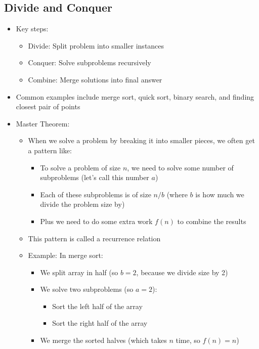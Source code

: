 \documentclass[11pt,a4paper]{article}
\begin{document}
\begin{multicols}{2}
\subsection{Divide and Conquer}
\begin{itemize}
    \item Key steps:
    \begin{itemize}
        \item Divide: Split problem into smaller instances
        \item Conquer: Solve subproblems recursively
        \item Combine: Merge solutions into final answer
    \end{itemize}
    \item Common examples include merge sort, quick sort, binary search, and finding closest pair of points
    \item Master Theorem:
    \begin{itemize}
        \item When we solve a problem by breaking it into smaller pieces, we often get a pattern like:
        \begin{itemize}
            \item To solve a problem of size $n$, we need to solve some number of subproblems (let's call this number $a$)
            \item Each of these subproblems is of size $n/b$ (where $b$ is how much we divide the problem size by)
            \item Plus we need to do some extra work $f(n)$ to combine the results
        \end{itemize}
        \item This pattern is called a recurrence relation
        \item Example: In merge sort:
        \begin{itemize}
            \item We split array in half (so $b = 2$, because we divide size by 2)
            \item We solve two subproblems (so $a = 2$):
            \begin{itemize}
                \item Sort the left half of the array
                \item Sort the right half of the array
            \end{itemize}
            \item We merge the sorted halves (which takes $n$ time, so $f(n) = n$)

\end{itemize}
\end{itemize}
\end{itemize}
\end{multicols}
\end{document}
